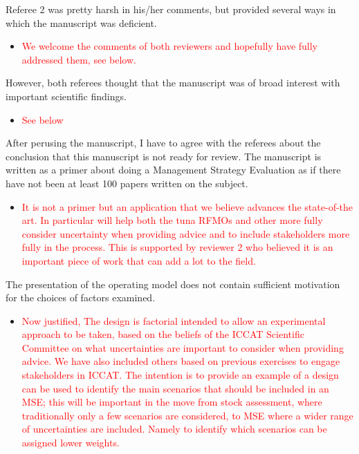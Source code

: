 \documentclass[a4paper,10pt]{article}
\newcommand{\red}{\textcolor{red}}
\begin{document}
 Referee 2 was pretty harsh in his/her comments, but provided several ways in which the manuscript was deficient. 
  \begin{itemize}
    \item  \red{We welcome the comments of both reviewers and hopefully have fully addressed them, see below.}
  \end{itemize}
 
 However, both referees thought that the manuscript was of broad interest with important scientific findings.
 \begin{itemize}
    \item  \red{See below}
  \end{itemize}
 
After perusing the manuscript, I have to agree with the referees about the conclusion that this manuscript is not ready for review. The manuscript is written as a primer about doing a Management Strategy Evaluation as if there have not been at least 100 papers written on the subject.  \begin{itemize}
    \item  \red{It is not a primer but an application that we believe advances the state-of-the art. In particular will help both the tuna RFMOs and other more fully consider uncertainty when providing advice and to include stakeholders more fully in the process. This is supported by reviewer 2 who believed it is an important piece of work that can add a lot to the field.}
  \end{itemize}
 
 The presentation of the operating model does not contain sufficient motivation for the choices of factors examined. 
  \begin{itemize}
    \item  \red{Now justified, The design is factorial intended to allow an experimental approach to be taken, based on the beliefs of the ICCAT Scientific Committee on what uncertainties are important to consider when providing advice. We have also included others based on previous exercises to engage stakeholders in ICCAT. The intention is to provide an example of a design can be used to identify the main scenarios that should be included in an MSE; this will be important in the move from stock assessment, where traditionally only a few scenarios are considered, to MSE where a wider range of uncertainties are included. Namely to identify which scenarios can be assigned lower weights.}
  \end{itemize}
  
\end{document}
